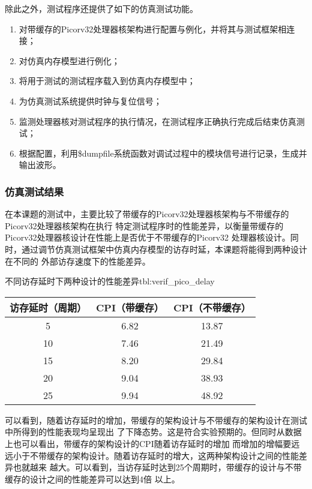 除此之外，测试程序还提供了如下的仿真测试功能。

\begin{enumerate}
  \item 对带缓存的Picorv32处理器核架构进行配置与例化，并将其与测试框架相连接；
  \item 对仿真内存模型进行例化；
  \item 将用于测试的测试程序载入到仿真内存模型中；
  \item 为仿真测试系统提供时钟与复位信号；
  \item 监测处理器核对测试程序的执行情况，在测试程序正确执行完成后结束仿真测试；
  \item 根据配置，利用\$dumpfile系统函数对调试过程中的模块信号进行记录，生成并输出波形。
\end{enumerate}

\subsubsection{仿真测试结果}

在本课题的测试中，主要比较了带缓存的Picorv32处理器核架构与不带缓存的Picorv32处理器核架构在执行
特定测试程序时的性能差异，以衡量带缓存的Picorv32处理器核设计在性能上是否优于不带缓存的Picorv32
处理器核设计。同时，通过调节仿真测试框架中仿真内存模型的访存时延，本课题将能得到两种设计在不同的
外部访存速度下的性能差异。

\begin{generaltab}{不同访存延时下两种设计的性能差异}{tbl:verif_pico_delay}
  \begin{tabular}{c|cc}
    \toprule
    访存延时（周期） & CPI（带缓存） & CPI（不带缓存） \\
    \midrule
    5 & 6.82 & 13.87 \\
    10 & 7.46 & 21.49 \\
    15 & 8.20 & 29.84 \\
    20 & 9.04 & 38.93 \\
    25 & 9.94 & 48.92 \\
    \bottomrule
  \end{tabular}
\end{generaltab}

可以看到，随着访存延时的增加，带缓存的架构设计与不带缓存的架构设计在测试中所得到的性能表现均呈现出
了下降态势。这是符合实验预期的。但同时从数据上也可以看出，带缓存的架构设计的CPI随着访存延时的增加
而增加的增幅要远远小于不带缓存的架构设计。随着访存延时的增大，这两种架构设计之间的性能差异也就越来
越大。可以看到，当访存延时达到25个周期时，带缓存的设计与不带缓存的设计之间的性能差异可以达到4倍
以上。

